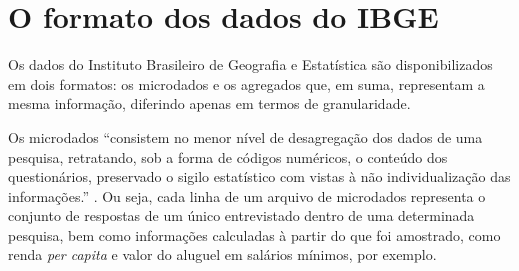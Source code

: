 




\section{O formato dos dados do IBGE}

    Os dados do Instituto Brasileiro de Geografia e Estatística são disponibilizados em dois formatos: os microdados e os agregados que, em suma, representam a mesma informação, diferindo apenas em termos de granularidade.

    Os microdados ``consistem no menor nível de desagregação dos dados de uma pesquisa, retratando, sob a forma de códigos numéricos, o conteúdo dos questionários, preservado o sigilo estatístico com vistas à não individualização das informações.'' \cite{microdados}. Ou seja, cada linha de um arquivo de microdados representa o conjunto de respostas de um único entrevistado dentro de uma determinada pesquisa, bem como informações calculadas à partir do que foi amostrado, como renda \textit{per capita} e valor do aluguel em salários mínimos, por exemplo.

